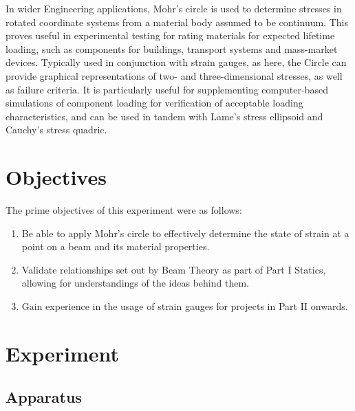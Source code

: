 \documentclass[12pt]{article}
\begin{document}
In wider Engineering applications, Mohr's circle is used to determine stresses in rotated coordinate systems from a material body assumed to be continuum. This proves useful in experimental testing for rating materials for expected lifetime loading, such as components for buildings, transport systems and mass-market devices. Typically used in conjunction with strain gauges, as here, the Circle can provide graphical representations of two- and three-dimensional stresses, as well as failure criteria. It is particularly useful for supplementing computer-based simulations of component loading for verification of acceptable loading characteristics, and can be used in tandem with Lame's stress ellipsoid and Cauchy's stress quadric.


\section{Objectives}

The prime objectives of this experiment were as follows:

\begin{enumerate}
	\item Be able to apply Mohr's circle to effectively determine the state of strain at a point on a beam and its material properties.
	\item Validate relationships set out by Beam Theory as part of Part I Statics, allowing for understandings of the ideas behind them.
	\item Gain experience in the usage of strain gauges for projects in Part II onwards.
\end{enumerate}


\section{Experiment}
\subsection{Apparatus}
\end{document}
